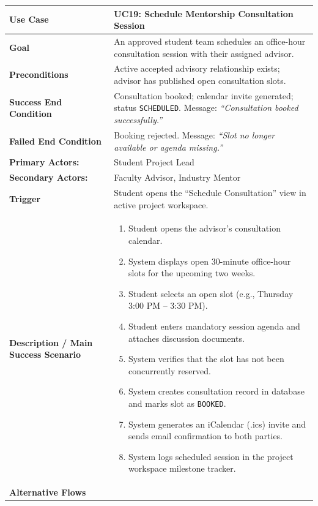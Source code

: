 \begin{table}[H]
\centering
\small
\begin{tabularx}{\textwidth}{|l|X|}
\hline
\rowcolor{lightgray!40} \textbf{Use Case} & \textbf{UC19: Schedule Mentorship Consultation Session} \\ \hline
\textbf{Goal} & An approved student team schedules an office-hour consultation session with their assigned advisor. \\ \hline
\textbf{Preconditions} & Active accepted advisory relationship exists; advisor has published open consultation slots. \\ \hline
\textbf{Success End Condition} & Consultation booked; calendar invite generated; status \texttt{SCHEDULED}. Message: \textit{``Consultation booked successfully.''} \\ \hline
\textbf{Failed End Condition} & Booking rejected. Message: \textit{``Slot no longer available or agenda missing.''} \\ \hline
\textbf{Primary Actors:} & Student Project Lead \\
\textbf{Secondary Actors:} & Faculty Advisor, Industry Mentor \\ \hline
\textbf{Trigger} & Student opens the ``Schedule Consultation'' view in active project workspace. \\ \hline
\textbf{Description / Main Success Scenario} &
\begin{enumerate}[leftmargin=*]
    \item Student opens the advisor's consultation calendar.
    \item System displays open 30-minute office-hour slots for the upcoming two weeks.
    \item Student selects an open slot (e.g., Thursday 3:00 PM -- 3:30 PM).
    \item Student enters mandatory session agenda and attaches discussion documents.
    \item System verifies that the slot has not been concurrently reserved.
    \item System creates consultation record in database and marks slot as \texttt{BOOKED}.
    \item System generates an iCalendar (.ics) invite and sends email confirmation to both parties.
    \item System logs scheduled session in the project workspace milestone tracker.
\end{enumerate} \\ \hline
\textbf{Alternative Flows} &

\end{tabularx}
\end{table}
